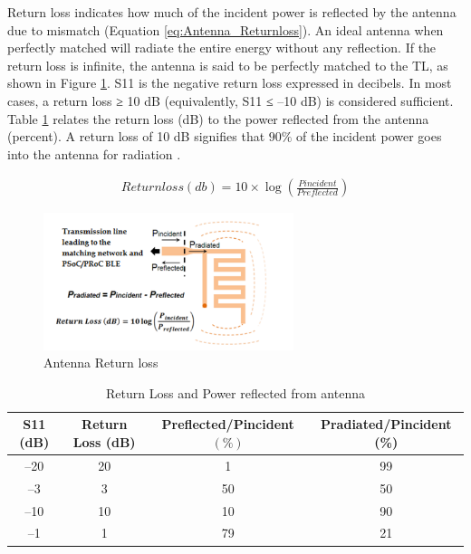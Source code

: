 \indent  Return loss indicates how much of the incident power is reflected by the antenna due to mismatch (Equation \ref{eq:Antenna_Returnloss}).
An ideal antenna when perfectly matched will radiate the entire energy without any reflection. If the return loss is infinite, the antenna is said to be perfectly matched to the TL, as shown in Figure \ref{fig:ANTENNA_RETUNRNLOSS}. S11 is the negative return loss expressed in decibels. In most cases, a return loss ≥ 10 dB (equivalently, S11 ≤ –10 dB) is considered sufficient. Table \ref{tb:ANTENNA_RETURNlOSS_TABLE} relates the return loss (dB) to the power reflected from the antenna (percent). 
A return loss of 10 dB signifies that $90\%$ of the incident power goes into the antenna for radiation \cite{AN91445}.

\begin{equation}\label{eq:Antenna_Returnloss}
    \begin{split}
        Returnloss(db) = 10 \times \log( \frac{Pincident}{Preflected})
    \end{split}
\end{equation}

\begin{figure}[h]
	\centering
	\includegraphics[width=0.65\textwidth]{Chap03/Figures/Antenna_ReturnLoss.PNG}
	\caption{Antenna Return loss}
	\label{fig:ANTENNA_RETUNRNLOSS}
\end{figure}

\begin{table}[h]
	\begin{tabular}{|c|c|c|c| }
		\hline 
		S11 (dB) & Return Loss (dB) & Preflected/Pincident $(\%)$ & Pradiated/Pincident (\%) \\ 
		\hline
		–20 &20 &1 &99\\
		\hline
		–3 &3 &50 &50\\
		\hline
		–10 &10 &10& 90\\
		\hline
		–1 &1 &79 &21\\
		\hline
	\end{tabular}
	\caption{Return Loss and Power reflected from antenna}
	\label{tb:ANTENNA_RETURNlOSS_TABLE}
\end{table}



